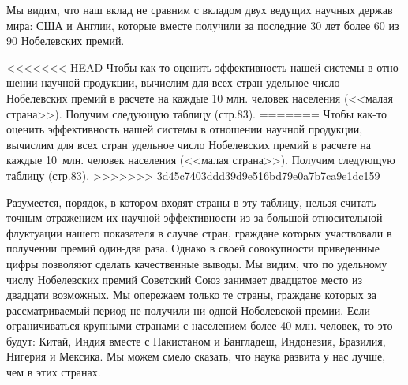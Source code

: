 \documentclass{book}
\begin{document}
Мы видим, что наш вклад не сравним с вкладом двух ведущих научных держав мира: США и Англии, которые вместе получили за 
последние 30 лет более 60 из 90 Нобелевских премий.

<<<<<<< HEAD
Чтобы как‑то оценить эффективность нашей системы в отно­шении научной продукции, вычислим для всех стран удельное число 
Нобелевских премий в расчете на каждые 10 млн. человек населения (<<малая страна>>). Получим следующую таблицу (стр.83).
=======
Чтобы как-то оценить эффективность нашей системы в отно­шении научной продукции, вычислим для всех стран удельное число 
Нобелевских премий в расчете на каждые 10~млн. человек населения (<<малая страна>>). Получим следующую таблицу (стр.83).
>>>>>>> 3d45c7403ddd39d9e516bd79e0a7b7ca9e1dc159

Разумеется, порядок, в котором входят страны в эту табли­цу, нельзя считать точным отражением их научной эффективности из-за 
большой относительной флуктуации нашего показателя в случае стран, граждане которых участвовали в получении премий один-два 
раза. Однако в своей совокупности приведенные цифры позволяют сделать качественные выводы. Мы видим, что по удельному числу 
Нобелевских премий Советский Союз занимает двадцатое место из двадцати возможных. Мы опережаем только те страны, граждане 
которых за рассматриваемый период не получили ни одной Нобелевской премии. Если ограничиваться крупными странами с населением 
более 40 млн. человек, то это будут: Китай, Индия вместе с Пакистаном и Бангладеш, Индонезия, Бразилия, Нигерия и Мексика. Мы 
можем смело сказать, что наука развита у нас лучше, чем в этих странах.
\end{document}
